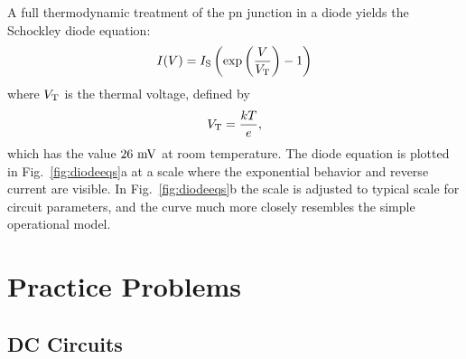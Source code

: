 A full thermodynamic treatment of the pn junction in a diode yields the Schockley diode equation:
\begin{displaymath}
I(V) = I_{\rm S} \left( \exp\left( \frac{V}{V_{\rm T}}\right) - 1 \right)
\end{displaymath}
where $V_{\rm T}$ is the thermal voltage, defined by 
\begin{displaymath}
V_{\rm T} = \frac{kT}{e},
\end{displaymath}
which has the value $26~\rm mV$ at room temperature.  The diode equation is plotted in Fig.~\ref{fig:diodeeqs}a at a scale where the exponential behavior and reverse current are visible.  In Fig.~\ref{fig:diodeeqs}b the scale is adjusted to typical scale for circuit parameters, and the curve much more closely resembles the simple operational model. 

\appendix

\chapter{Practice Problems}

\section{DC Circuits}

